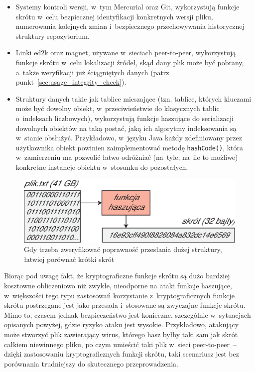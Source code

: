 \begin{itemize}

    \item Systemy kontroli wersji, w~tym Mercurial oraz Git, wykorzystują
    funkcje skrótu w~celu bezpiecznej identyfikacji konkretnych wersji pliku,
    numerowania kolejnych zmian i~bezpiecznego przechowywania historycznej
    struktury repozytorium.

    \item Linki ed2k oraz magnet, używane w~sieciach peer-to-peer, wykorzystują
    funkcje skrótu w~celu lokalizacji źródeł, skąd dany plik może być pobrany,
    a~także weryfikacji już ściągniętych danych (patrz
    punkt~\ref{sec:usage_integrity_check}).

    \item Struktury danych takie jak tablice mieszające (tzn. tablice, których
    kluczami może być dowolny obiekt, w~przeciwieństwie do klasycznych tablic
    o~indeksach liczbowych), wykorzystują funkcje haszujące do serializacji
    dowolnych obiektów na taką postać, jaką ich algorytmy indeksowania są
    w~stanie obsłużyć. Przykładowo, w~języku Java każdy zdefiniowany przez
    użytkownika obiekt powinien zaimplementować metodę \texttt{hashCode()},
    która w~zamierzeniu ma pozwolić łatwo odróżniać (na~tyle, na~ile to
    możliwe) konkretne instancje obiektu w~stosunku do pozostałych.

\end{itemize}

\begin{figure}[bht]
    \includegraphics[width=12cm]{img/usage3.eps}
    \caption{Gdy trzeba zweryfikować poprawność przesłania dużej struktury,
    łatwiej porównać krótki skrót}
\end{figure}

Biorąc pod uwagę fakt, że kryptograficzne funkcje skrótu są dużo bardziej
kosztowne obliczeniowo niż zwykłe, nieodporne na ataki funkcje haszujące,
w~większości tego typu zastosowań korzystanie z~kryptograficznych funkcje
skrótu postrzegane jest jako przesada i~stosowane są zwyczajne funkcje skrótu.
Mimo to, czasem jednak bezpieczeństwo jest konieczne, szczególnie w~sytuacjach
opisanych powyżej, gdzie ryzyko ataku jest wysokie. Przykładowo, atakujący może
stworzyć plik zawierający wirus, którego hasz byłby taki sam jak skrót całkiem
niewinnego pliku, po czym umieścić taki plik w~sieci peer-to-peer~-- dzięki
zastosowaniu kryptograficznych funkcji skrótu, taki scenariusz jest bez
porównania trudniejszy do skutecznego przeprowadzenia.



